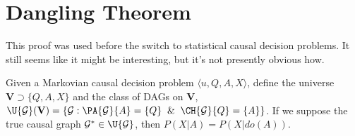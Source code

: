 
\section{Dangling Theorem}

This proof was used before the switch to statistical causal decision problems. It still seems like it might be interesting, but it's not presently obvious how.

\begin{theorem}[In a Markovian CDP, $P(X|Q)=P(X|do(Q))$ ]
Given a Markovian causal decision problem $\langle u, Q, A, X\rangle$, define the universe $\mathbf{V}\supset\{Q,A,X\}$ and the class of DAGs on $\mathbf{V}$, $\U{\mathcal{G}}(\mathbf{V})=\{\mathcal{G}:\PA{\mathcal{G}}{A}=\{Q\}\And \CH{\mathcal{G}}{Q}=\{A\}\}$. If we suppose the true causal graph $\mathcal{G}^*\in \U{\mathcal{G}}$, then $P(X|A)=P(X|do(A))$.
\end{theorem}



